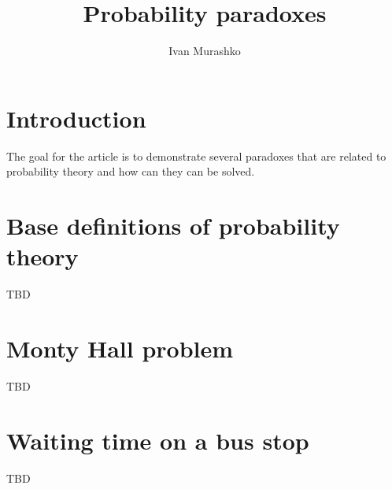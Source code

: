 \documentclass[14pt,a4paper]{article}
\title{Probability paradoxes}
\author{Ivan Murashko}
\date{}
\begin{document}
\maketitle
\tableofcontents

\section*{Introduction}
The goal for the article is to demonstrate several paradoxes that are
related to probability theory and how can they can be solved.

\section{Base definitions of probability theory}
TBD \cite{bib:kolmogorov74basic}

\section{Monty Hall problem}
TBD

\section{Waiting time on a bus stop}
TBD

  
     
\end{document}
